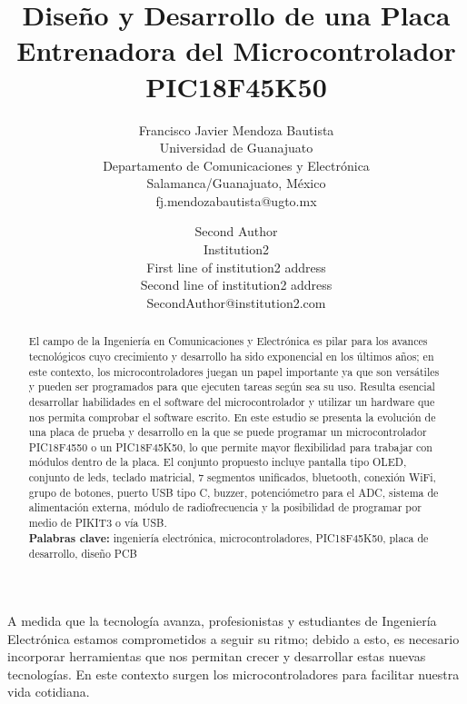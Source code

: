 \documentclass[times, 10pt,twocolumn]{article}
\begin{document}
\title{Diseño y Desarrollo de una Placa Entrenadora del Microcontrolador PIC18F45K50}
\author{Francisco Javier Mendoza Bautista\\
Universidad de Guanajuato\\ Departamento de Comunicaciones y Electrónica \\  
Salamanca/Guanajuato, México\\fj.mendozabautista@ugto.mx\\
\and
Second Author\\
Institution2\\
First line of institution2 address\\ Second line of institution2 address\\ 
SecondAuthor@institution2.com\\
}

\maketitle
\thispagestyle{empty}

\begin{abstract} 
El campo de la Ingeniería en Comunicaciones y Electrónica es pilar para los avances tecnológicos cuyo crecimiento y desarrollo ha sido exponencial en los últimos años; en este contexto, los microcontroladores juegan un papel importante ya que son versátiles y pueden ser programados para que ejecuten tareas según sea su uso. Resulta esencial desarrollar habilidades en el software del microcontrolador y utilizar un hardware que nos permita comprobar el software escrito. En este estudio se presenta la evolución de una placa de prueba y desarrollo en la que se puede programar un microcontrolador PIC18F4550 o un PIC18F45K50, lo que permite mayor flexibilidad para trabajar con módulos dentro de la placa. El conjunto propuesto incluye pantalla tipo OLED, conjunto de leds, teclado matricial, 7 segmentos unificados, bluetooth, conexión WiFi, grupo de botones, puerto USB tipo C, buzzer, potenciómetro para el ADC, sistema de alimentación externa, módulo de radiofrecuencia y la posibilidad de programar por medio de PIKIT3 o vía USB.\\

\textbf{Palabras clave:} ingeniería electrónica, microcontroladores, PIC18F45K50, placa de desarrollo, diseño PCB
\end{abstract}
\vspace*{-0.6cm}
\vspace*{-0.1cm}
A  medida que la tecnología avanza, profesionistas y estudiantes de Ingeniería Electrónica estamos comprometidos a seguir su ritmo; debido a esto, es necesario incorporar herramientas que nos permitan crecer y desarrollar estas nuevas tecnologías. En este contexto surgen los microcontroladores para facilitar nuestra vida cotidiana.
\end{document}
